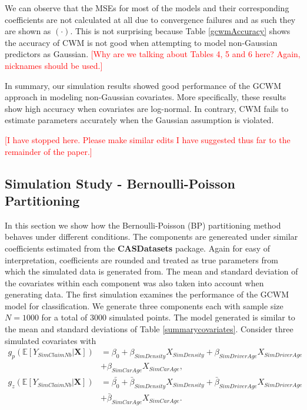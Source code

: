 \documentclass[11pt,letterpaper]{article}
\numberwithin{equation}{section}
\numberwithin{equation}{section}
\numberwithin{equation}{section}
\begin{document}
We can observe that the MSEs for most of the models and their corresponding coefficients are not calculated at all due to convergence failures and as such they are shown as $(\cdot)$. This is not surprising because Table \ref{gcwmAccuracy} shows the accuracy of CWM is not good when attempting to model non-Gaussian predictors as Gaussian. \textcolor{red}{[Why are we talking about Tables 4, 5 and 6 here? Again, nicknames should be used.]}

In summary, our simulation results showed good performance of the GCWM approach in modeling non-Gaussian covariates. More specifically, these results show high accuracy when covariates are log-normal. In contrary, CWM fails to estimate parameters accurately when the Gaussian assumption is violated.

\clearpage\textcolor{red}{[I have stopped here. Please make similar edits I have suggested thus far to the remainder of the paper.]}


\subsection{Simulation Study - Bernoulli-Poisson Partitioning}

In this section we show how the Bernoulli-Poisson (BP) partitioning method behaves under different conditions. The components are genereated under similar coefficients estimated from the \textbf{CASDatasets} package. Again for easy of interpretation, coefficients are rounded and treated as true parameters from which the simulated data is generated from. The mean and standard deviation of the covariates within each component was also taken into account when generating data. The first simulation examines the performance of the GCWM model for classification. We generate three components each with sample size $N=1000$ for a total of $3000$ simulated points.
The model generated is similar to the mean and standard deviations of Table \ref{summarycovariates}. Consider three simulated covariates with 
\begin{align}
g_p(\mathbb{E}\left[Y_{SimClaimNb}|\bm{X}\right]) & = 
  \beta_{0} +  \beta_{SimDensity} X_{SimDensity} +  \beta_{SimDriverAge} X_{SimDriverAge} \nonumber  \\ & + 
   \beta_{SimCarAge} X_{SimCarAge},  \label{poissonRegSim} \\
g_z(\mathbb{E}\left[Y_{SimClaimNb}|\bm{X}\right]) & = 
  \bar{\beta_{0}} +  \bar{\beta}_{SimDensity} X_{SimDensity} +  \bar{\beta}_{SimDriverAge} X_{SimDriverAge} \nonumber \\ & + 
  \bar{ \beta}_{SimCarAge} X_{SimCarAge}.  \label{zeroRegSim}
\end{align}
\end{document}
